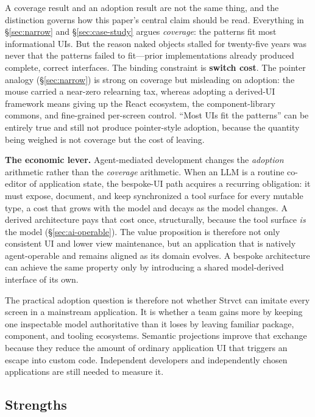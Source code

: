 \documentclass[sigplan,review,anonymous,10pt]{acmart}
\begin{document}
A coverage result and an adoption result are not the same thing, and the distinction governs how this paper's central claim should be read. Everything in \S\ref{sec:narrow} and \S\ref{sec:case-study} argues \emph{coverage}: the patterns fit most informational UIs. But the reason naked objects stalled for twenty-five years was never that the patterns failed to fit---prior implementations already produced complete, correct interfaces. The binding constraint is \textbf{switch cost}. The pointer analogy (\S\ref{sec:narrow}) is strong on coverage but misleading on adoption: the mouse carried a near-zero relearning tax, whereas adopting a derived-UI framework means giving up the React ecosystem, the component-library commons, and fine-grained per-screen control. ``Most UIs fit the patterns'' can be entirely true and still not produce pointer-style adoption, because the quantity being weighed is not coverage but the cost of leaving.

\textbf{The economic lever.} Agent-mediated development changes the \emph{adoption} arithmetic rather than the \emph{coverage} arithmetic. When an LLM is a routine co-editor of application state, the bespoke-UI path acquires a recurring obligation: it must expose, document, and keep synchronized a tool surface for every mutable type, a cost that grows with the model and decays as the model changes. A derived architecture pays that cost once, structurally, because the tool surface \emph{is} the model (\S\ref{sec:ai-operable}). The value proposition is therefore not only consistent UI and lower view maintenance, but an application that is natively agent-operable and remains aligned as its domain evolves. A bespoke architecture can achieve the same property only by introducing a shared model-derived interface of its own.

The practical adoption question is therefore not whether Strvct can imitate every screen in a mainstream application. It is whether a team gains more by keeping one inspectable model authoritative than it loses by leaving familiar package, component, and tooling ecosystems. Semantic projections improve that exchange because they reduce the amount of ordinary application UI that triggers an escape into custom code. Independent developers and independently chosen applications are still needed to measure it.

\subsection{Strengths}
\end{document}
